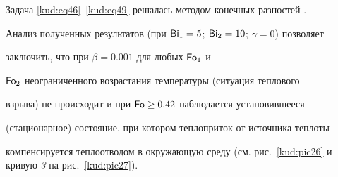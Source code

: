 Задача \eqref{kud:eq46}--\eqref{kud:eq49} решалась методом конечных разностей  \cite{kud:mc:bib6}. 

Анализ полученных результатов (при $ {\sf Bi}_1 =5$; $ {\sf Bi}_2 =10$; $\gamma =0$) позволяет

заключить, что при $\beta =0.001$ для любых $\operatorname{\sf Fo}_1$ и

$\operatorname{\sf Fo}_2$ неограниченного возрастания температуры (ситуация теплового

взрыва) не происходит и при $\operatorname{\sf Fo}\ge 0.42$ наблюдается установившееся

(стационарное) состояние, при котором теплоприток от источника теплоты

компенсируется теплоотводом в окружающую среду (см. рис.~\ref{kud:pic26} и кривую {\sl 3} на рис.~\ref{kud:pic27}).



